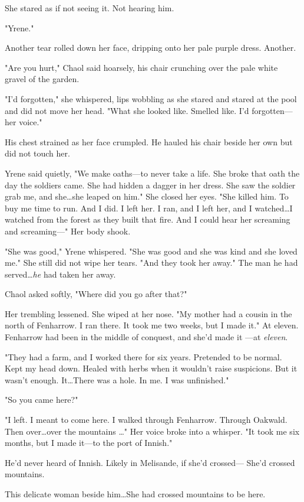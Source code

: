 She stared as if not seeing it.
Not hearing him.

"Yrene."

Another tear rolled down her face, dripping onto her pale purple dress.
Another.

"Are you hurt," Chaol said hoarsely, his chair crunching over the pale white gravel of the garden.

"I'd forgotten," she whispered, lips wobbling as she stared and stared at the pool and did not move her head.
"What she looked like.
Smelled like.
I'd forgotten---her voice."

His chest strained as her face crumpled.
He hauled his chair beside her own but did not touch her.

Yrene said quietly, "We make oaths---to never take a life.
She broke that oath the day the soldiers came.
She had hidden a dagger in her dress.
She saw the soldier grab me, and she\ldots she leaped on him."
She closed her eyes.
"She killed him.
To buy me time to run.
And I did.
I left her.
I ran, and I left her, and I watched\ldots I watched from the forest as they built that fire.
And I could hear her screaming and screaming---" Her body shook.

"She was good," Yrene whispered.
"She was good and she was kind and she loved me."
She still did not wipe her tears.
"And they took her away."
The man he had served\ldots \emph{he} had taken her away.

Chaol asked softly, "Where did you go after that?"

Her trembling lessened.
She wiped at her nose.
"My mother had a cousin in the north of Fenharrow.
I ran there.
It took me two weeks, but I made it."
At eleven.
Fenharrow had been in the middle of conquest, and she'd made it ---at \emph{eleven}.

"They had a farm, and I worked there for six years.
Pretended to be normal.
Kept my head down.
Healed with herbs when it wouldn't raise suspicions.
But it wasn't enough.
It\ldots There was a hole.
In me.
I was unfinished."

"So you came here?"

"I left.
I meant to come here.
I walked through Fenharrow.
Through Oakwald.
Then over\ldots over the mountains \ldots" Her voice broke into a whisper.
"It took me six months, but I made it---to the port of Innish."

He'd never heard of Innish.
Likely in Melisande, if she'd crossed--- She'd crossed mountains.

This delicate woman beside him\ldots She had crossed mountains to be here.

